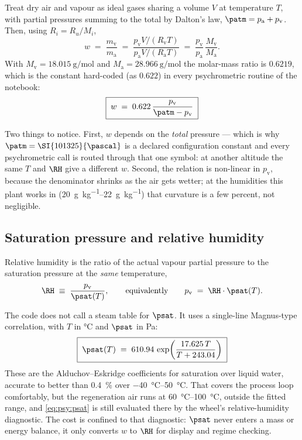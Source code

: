 Treat dry air and vapour as ideal gases sharing a volume $V$ at temperature $T$, with partial
pressures summing to the total by Dalton's law, $\patm = p_{\mathrm{a}} + p_{\mathrm{v}}$. Then,
using $R_i = R_u/M_i$,
\begin{equation}
w \;=\; \frac{m_{\mathrm{v}}}{m_{\mathrm{a}}}
\;=\; \frac{p_{\mathrm{v}} V/(R_{\mathrm{v}} T)}{p_{\mathrm{a}} V/(R_{\mathrm{a}} T)}
\;=\; \frac{p_{\mathrm{v}}}{p_{\mathrm{a}}}\,\frac{M_{\mathrm{v}}}{M_{\mathrm{a}}} .
\label{eq:psy:w_ideal}
\end{equation}
With $M_{\mathrm{v}} = \SI{18.015}{\gram\per\mole}$ and $M_{\mathrm{a}} =
\SI{28.966}{\gram\per\mole}$ the molar-mass ratio is $0.6219$, which is the constant hard-coded (as
$0.622$) in every psychrometric routine of the notebook:
\begin{equation}
\boxed{\;w \;=\; 0.622\,\frac{p_{\mathrm{v}}}{\patm - p_{\mathrm{v}}}\;} \label{eq:psy:w_from_pv}
\end{equation}

Two things to notice. First, $w$ depends on the \emph{total} pressure --- which is why $\patm =
\SI{101325}{\pascal}$ is a declared configuration constant and every psychrometric call is routed
through that one symbol: at another altitude the same $T$ and $\RH$ give a different $w$. Second,
the relation is non-linear in $p_{\mathrm{v}}$, because the denominator shrinks as the air gets
wetter; at the humidities this plant works in (\SIrange{20}{22}{\gram\per\kilogram}) that curvature
is a few percent, not negligible.

\subsection{Saturation pressure and relative humidity}
\label{sec:psy:psat}

Relative humidity is the ratio of the actual vapour partial pressure to the saturation pressure at
the \emph{same} temperature,
\begin{equation}
\RH \;\equiv\; \frac{p_{\mathrm{v}}}{\psat(T)} , \qquad\text{equivalently}\qquad
p_{\mathrm{v}} \;=\; \RH \cdot \psat(T) . \label{eq:psy:RHdef}
\end{equation}

The code does not call a steam table for $\psat$. It uses a single-line Magnus-type correlation,
with $T$ in \si{\celsius} and $\psat$ in \si{\pascal}:
\begin{equation}
\boxed{\;\psat(T) \;=\; 610.94\, \exp\!\left(\frac{17.625\,T}{T + 243.04}\right)\;}
\label{eq:psy:psat}
\end{equation}
These are the Alduchov--Eskridge coefficients for saturation over liquid water, accurate to better
than \SI{0.4}{\percent} over \SIrange{-40}{50}{\celsius}. That covers the process loop comfortably,
but the regeneration air runs at \SIrange{60}{100}{\celsius}, outside the fitted range, and
\eqref{eq:psy:psat} is still evaluated there by the wheel's relative-humidity diagnostic. The cost
is confined to that diagnostic: $\psat$ never enters a mass or energy balance, it only converts $w$
to $\RH$ for display and regime checking.

